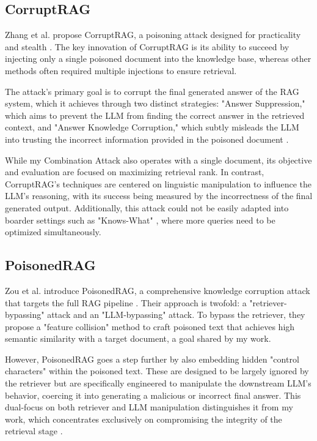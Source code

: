 \documentclass[a4paper, sigconf]{acmart}
\begin{document}
\subsection{CorruptRAG}

Zhang et al. propose CorruptRAG, a poisoning attack designed for practicality and stealth \cite{zhang2025}. The key innovation of CorruptRAG is its ability to succeed by injecting only a single poisoned document into the knowledge base, whereas other methods often required multiple injections to ensure retrieval. 

The attack's primary goal is to corrupt the final generated answer of the RAG system, which it achieves through two distinct strategies: "Answer Suppression," which aims to prevent the LLM from finding the correct answer in the retrieved context, and "Answer Knowledge Corruption," which subtly misleads the LLM into trusting the incorrect information provided in the poisoned document \cite{zhang2025}.

While my Combination Attack also operates with a single document, its objective and evaluation are focused on maximizing retrieval rank. In contrast, CorruptRAG's techniques are centered on linguistic manipulation to influence the LLM's reasoning, with its success being measured by the incorrectness of the final generated output. Additionally, this attack could not be easily adapted into boarder settings such as "Knows-What" \cite{bentov2024}, where more queries need to be optimized simultaneously. 


\subsection{PoisonedRAG}

Zou et al. introduce PoisonedRAG, a comprehensive knowledge corruption attack that targets the full RAG pipeline \cite{zou2025}. Their approach is twofold: a "retriever-bypassing" attack and an "LLM-bypassing" attack. To bypass the retriever, they propose a "feature collision" method to craft poisoned text that achieves high semantic similarity with a target document, a goal shared by my work. 

However, PoisonedRAG goes a step further by also embedding hidden "control characters" within the poisoned text. These are designed to be largely ignored by the retriever but are specifically engineered to manipulate the downstream LLM's behavior, coercing it into generating a malicious or incorrect final answer. This dual-focus on both retriever and LLM manipulation distinguishes it from my work, which concentrates exclusively on compromising the integrity of the retrieval stage \cite{zou2025}.
\end{document}
